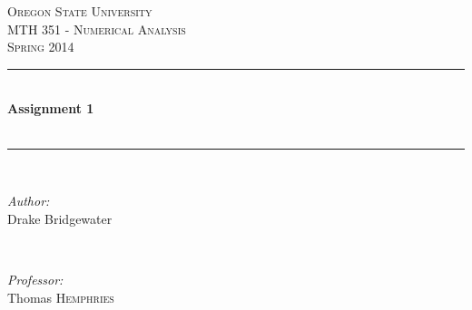 \documentclass[letterpaper,12pt]{article}
\def\name{Drake Bridgewater}
\def\title{Assignment 1}
\def\subtitle{}
\def\subject{MTH }
\def\courseNumber{ 351 }
\def\courseName{Numerical Analysis}
\def\courseInfo{Spring 2014 }%
\def\supervisor{Thomas \textsc{Hemphries}} %
\begin{document}
\begin{titlepage}

\newcommand{\HRule}{\rule{\linewidth}{0.5mm}} %

\center %
 

\textsc{\LARGE Oregon State University}\\[1.5cm] %
\textsc{\Large \subject \courseNumber - \courseName}\\[0.5cm] %
\textsc{\large \courseInfo}\\[0.5cm] %


\HRule \\[0.4cm]
{ \huge \bfseries \title }\\[0.4cm] %
{\small \textit{\subtitle}}\\[0.4cm]
\HRule \\[1.5cm]
 

\begin{minipage}{0.4\textwidth}
\begin{flushleft} \large
\emph{Author:}\\
\name
\end{flushleft}
\end{minipage}
~
\begin{minipage}{0.4\textwidth}
\begin{flushright} \large
\emph{Professor:} \\
\supervisor
\end{flushright}
\end{minipage}\\[4cm]



\end{titlepage}
\end{document}
